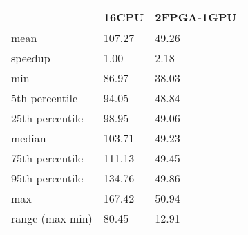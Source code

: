 \begin{tabular}{lll}
\toprule
 & 16CPU & 2FPGA-1GPU \\
\midrule
mean & 107.27 & 49.26 \\
speedup & 1.00 & 2.18 \\
min & 86.97 & 38.03 \\
5th-percentile & 94.05 & 48.84 \\
25th-percentile & 98.95 & 49.06 \\
median & 103.71 & 49.23 \\
75th-percentile & 111.13 & 49.45 \\
95th-percentile & 134.76 & 49.86 \\
max & 167.42 & 50.94 \\
range (max-min) & 80.45 & 12.91 \\
\bottomrule
\end{tabular}
